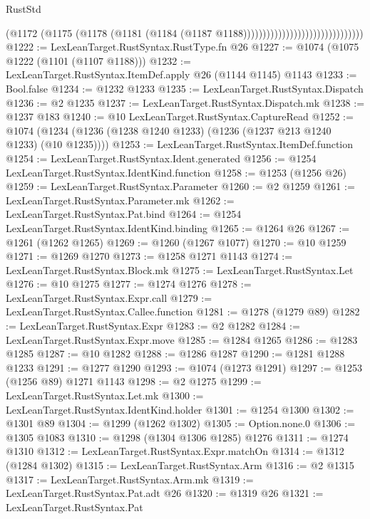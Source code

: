 \begin{lexlean}{RustStd}
\begin{coremodule}
                                                      (@1172
                                                        (@1175
                                                          (@1178
                                                            (@1181
                                                              (@1184
                                                                (@1187
                                                                  @1188)))))))))))))))))))))))))))))))
@1222 := LexLeanTarget.RustSyntax.RustType.fn @26
@1227 := @1074 (@1075 @1222 (@1101 (@1107 @1188)))
@1232 := LexLeanTarget.RustSyntax.ItemDef.apply @26 (@1144 @1145) @1143
@1233 := Bool.false
@1234 := @1232 @1233
@1235 := LexLeanTarget.RustSyntax.Dispatch
@1236 := @2 @1235
@1237 := LexLeanTarget.RustSyntax.Dispatch.mk
@1238 := @1237 @183
@1240 := @10 LexLeanTarget.RustSyntax.CaptureRead
@1252 := @1074 (@1234 (@1236 (@1238 @1240 @1233) (@1236 (@1237 @213 @1240 @1233) (@10 @1235))))
@1253 := LexLeanTarget.RustSyntax.ItemDef.function
@1254 := LexLeanTarget.RustSyntax.Ident.generated
@1256 := @1254 LexLeanTarget.RustSyntax.IdentKind.function
@1258 := @1253 (@1256 @26)
@1259 := LexLeanTarget.RustSyntax.Parameter
@1260 := @2 @1259
@1261 := LexLeanTarget.RustSyntax.Parameter.mk
@1262 := LexLeanTarget.RustSyntax.Pat.bind
@1264 := @1254 LexLeanTarget.RustSyntax.IdentKind.binding
@1265 := @1264 @26
@1267 := @1261 (@1262 @1265)
@1269 := @1260 (@1267 @1077)
@1270 := @10 @1259
@1271 := @1269 @1270
@1273 := @1258 @1271 @1143
@1274 := LexLeanTarget.RustSyntax.Block.mk
@1275 := LexLeanTarget.RustSyntax.Let
@1276 := @10 @1275
@1277 := @1274 @1276
@1278 := LexLeanTarget.RustSyntax.Expr.call
@1279 := LexLeanTarget.RustSyntax.Callee.function
@1281 := @1278 (@1279 @89)
@1282 := LexLeanTarget.RustSyntax.Expr
@1283 := @2 @1282
@1284 := LexLeanTarget.RustSyntax.Expr.move
@1285 := @1284 @1265
@1286 := @1283 @1285
@1287 := @10 @1282
@1288 := @1286 @1287
@1290 := @1281 @1288 @1233
@1291 := @1277 @1290
@1293 := @1074 (@1273 @1291)
@1297 := @1253 (@1256 @89) @1271 @1143
@1298 := @2 @1275
@1299 := LexLeanTarget.RustSyntax.Let.mk
@1300 := LexLeanTarget.RustSyntax.IdentKind.holder
@1301 := @1254 @1300
@1302 := @1301 @89
@1304 := @1299 (@1262 @1302)
@1305 := Option.none.{0}
@1306 := @1305 @1083
@1310 := @1298 (@1304 @1306 @1285) @1276
@1311 := @1274 @1310
@1312 := LexLeanTarget.RustSyntax.Expr.matchOn
@1314 := @1312 (@1284 @1302)
@1315 := LexLeanTarget.RustSyntax.Arm
@1316 := @2 @1315
@1317 := LexLeanTarget.RustSyntax.Arm.mk
@1319 := LexLeanTarget.RustSyntax.Pat.adt @26
@1320 := @1319 @26
@1321 := LexLeanTarget.RustSyntax.Pat

\end{coremodule}
\end{lexlean}
